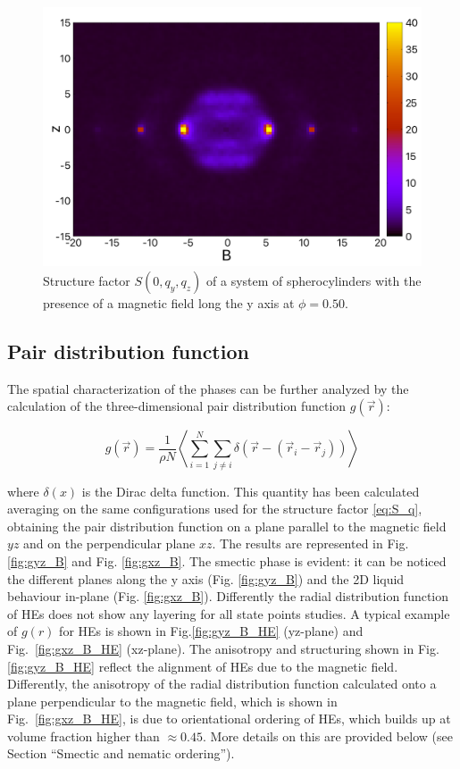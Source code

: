 \documentclass{article}
\begin{document}
\begin{figure}
    \centering
    \includegraphics[width=1\columnwidth]{Syz_B.png}
    \caption{Structure factor $S(0, q_y, q_z)$ of a system of spherocylinders with the presence of a magnetic field long the y axis at $\phi=0.50$.}
    \label{fig:Syz_B_HSC}
\end{figure}

\subsection{Pair distribution function}

The spatial characterization of the phases can be further analyzed by  the calculation of the three-dimensional pair distribution function $g(\vec{r})$:

\begin{equation}
    g(\vec{r}) = \frac{1}{\rho N} \left\langle \sum_{i=1}^N \sum_{j\neq i} \delta \left( \vec{r} - \left( \vec{r}_i - \vec{r}_j \right) \right) \right\rangle
\end{equation}

where $\delta(x)$ is the Dirac delta function. This quantity has been calculated averaging on the same configurations used for the structure factor \ref{eq:S_q}, obtaining the pair distribution function on a plane parallel to the magnetic field $yz$ and on the perpendicular plane $xz$. The results are represented in Fig. \ref{fig:gyz_B} and Fig. \ref{fig:gxz_B}. The smectic phase is evident: it can be noticed the different planes along the y axis (Fig. \ref{fig:gyz_B}) and the 2D liquid behaviour in-plane (Fig. \ref{fig:gxz_B}).
Differently the radial distribution function of HEs does not show any layering for all state points studies.
A typical example of $g(r)$ for HEs is shown in Fig.\ref{fig:gyz_B_HE} (yz-plane) and Fig.~\ref{fig:gxz_B_HE} (xz-plane). The anisotropy and structuring shown in Fig.\ref{fig:gyz_B_HE} reflect the alignment of HEs due
to the magnetic field. Differently, the anisotropy of the radial distribution function calculated
onto a plane perpendicular to the magnetic field, which is shown in Fig.~\ref{fig:gxz_B_HE}, is due to 
orientational ordering of HEs, which builds up at volume fraction higher than $\approx 0.45$. 
More details on this are provided below (see Section ``Smectic and nematic ordering'').
\end{document}

